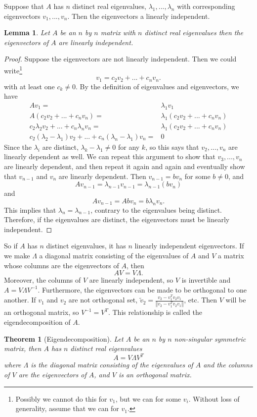 \documentclass[12pt,reqno]{amsart}
\newtheorem{theorem}{Theorem}[section]
\newtheorem{lemma}{Lemma}[section]
\theoremstyle{definition}
\newcommand{\norm}[1]{\left\Vert {#1} \right\Vert}
\begin{document}
Suppose that $A$ has $n$ distinct real eigenvalues, $\lambda_1, ...,
\lambda_n$ with corresponding eigenvectors $v_1, ..., v_n$. Then the
eigenvectors a linearly independent.
\begin{lemma}
  Let $A$ be an $n$ by $n$ matrix with $n$ distinct real eigenvalues
  then the eigenvectors of $A$ are linearly independent.
\end{lemma}
\begin{proof}
  Suppose the eigenvectors are not linearly independent. Then we could
  write\footnote{Possibly we cannot do this for $v_1$, but we can for
    some $v_i$. Without loss of generality, assume that we can for
    $v_1$.}
  \[ v_1 = c_2 v_2 + ... + c_n v_n. \]
  with at least one $c_k \neq 0$.
  By the definition of eigenvalues and eigenvectors, we have
  \begin{align*} A v_1 = & \lambda_1 v_1 \\
    A(c_2 v_2 + ... + c_n v_n) = & \lambda_1 \left(c_2 v_2 + ... + c_n
      v_n\right) \\
    c_2 \lambda_2 v_2 + ... + c_n \lambda_n v_n = & \lambda_1
    \left(c_2 v_2 + ... + c_n v_n\right) \\
    c_2 (\lambda_2 - \lambda_1) v_2 + ... + c_n (\lambda_n -
    \lambda_1) v_n = & 0
  \end{align*}
  Since the $\lambda_i$ are distinct, $\lambda_k - \lambda_1 \neq 0$
  for any $k$, so this says that $v_2, ..., v_n$ are linearly
  dependent as well. We can repeat this argument to show that $v_3,
  ..., v_n$ are linearly dependent, and then repeat it again and again
  and eventually show that $v_{n-1}$ and $v_n$ are linearly
  dependent. Then $v_{n-1} = bv_n$ for some $b \neq 0$, and 
  \[ A v_{n-1} = \lambda_{n-1} v_{n-1} = \lambda_{n-1} (b v_n) \]
  and 
  \[ A v_{n-1} = A b v_n = b \lambda_n v_n. \]
  This implies that $\lambda_n = \lambda_{n-1}$, contrary to the
  eigenvalues being distinct. Therefore, if the eigenvalues are
  distinct, the eigenvectors must be linearly independent.   
\end{proof}
So if $A$ has $n$ distinct eigenvalues, it has $n$ linearly
independent eigenvectors. If we make $\Lambda$ a diagonal matrix
consisting of the eigenvalues of $A$ and $V$ a matrix whose columns are
the eigenvectors of $A$, then 
\[ A V = V \Lambda. \]
Moreover, the columns of $V$ are linearly independent, so $V$ is
invertible and $A = V \Lambda V^{-1}$. Furthermore, the eigenvectors
can be made to be orthogonal to one another. If $v_1$ and $v_2$ are
not orthogonal set, $\tilde{v}_2 = \frac{v_2 - v_1^T v_2
  v_1}{\norm{v_2 - v_1^T v_2 v_1}}$, etc. Then $V$ will be an
orthogonal matrix, so $V^{-1} = V^T$. This relationship is called the
eigendecomposition of $A$.
\begin{theorem}[Eigendecomposition]\label{thm:eigen}
  Let $A$ be an $n$ by $n$ non-singular symmetric matrix, then $A$ has
  $n$ distinct real eigenvalues
  \[ A = V \Lambda V^T \]
  where $\Lambda$ is the diagonal matrix consisting of the eigenvalues
  of $A$ and the columns of $V$ are the eigenvectors of $A$, and $V$
  is an orthogonal matrix.  
\end{theorem}
\end{document}
